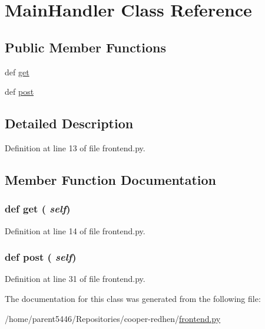 \hypertarget{classfrontend_1_1_main_handler}{
\section{MainHandler Class Reference}
\label{classfrontend_1_1_main_handler}
}
\subsection*{Public Member Functions}
\begin{DoxyCompactItemize}
\item 
def \hyperlink{classfrontend_1_1_main_handler_a444a1328efb32d5d9d2dcb2efe855d3b}{get}
\item 
def \hyperlink{classfrontend_1_1_main_handler_a49eef07c2e643292b02accabc4f0c182}{post}
\end{DoxyCompactItemize}


\subsection{Detailed Description}


Definition at line 13 of file frontend.py.

\subsection{Member Function Documentation}
\hypertarget{classfrontend_1_1_main_handler_a444a1328efb32d5d9d2dcb2efe855d3b}{
\subsubsection[{get}]{\setlength{\rightskip}{0pt plus 5cm}def get ( {\em self})}}
\label{classfrontend_1_1_main_handler_a444a1328efb32d5d9d2dcb2efe855d3b}


Definition at line 14 of file frontend.py.\hypertarget{classfrontend_1_1_main_handler_a49eef07c2e643292b02accabc4f0c182}{
\subsubsection[{post}]{\setlength{\rightskip}{0pt plus 5cm}def post ( {\em self})}}
\label{classfrontend_1_1_main_handler_a49eef07c2e643292b02accabc4f0c182}


Definition at line 31 of file frontend.py.

The documentation for this class was generated from the following file:\begin{DoxyCompactItemize}
\item 
/home/parent5446/Repositories/cooper-\/redhen/\hyperlink{frontend_8py}{frontend.py}\end{DoxyCompactItemize}
